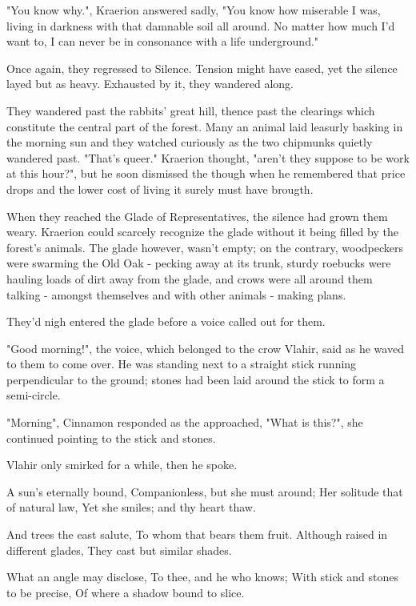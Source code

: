 "You know why.", Kraerion answered sadly, "You know how miserable I was, living in darkness with that damnable soil all around. No matter how much I'd want to, I can never be in consonance with a life underground."

Once again, they regressed to Silence. Tension might have eased, yet the silence layed but as heavy. Exhausted by it, they wandered along.

They wandered past the rabbits' great hill, thence past the clearings which constitute the central part of the forest. Many an animal laid leasurly basking in the morning sun and they watched curiously as the two chipmunks quietly wandered past. "That's queer." Kraerion thought, "aren't they suppose to be work at this hour?", but he soon dismissed the though when he remembered that price drops and the lower cost of living it surely must have brougth. %

When they reached the Glade of Representatives, the silence had grown them weary. Kraerion could scarcely recognize the glade without it being filled by the forest's animals. The glade however, wasn't empty; on the contrary, woodpeckers were swarming the Old Oak - pecking away at its trunk, sturdy roebucks were hauling loads of dirt away from the glade, and crows were all around them talking - amongst themselves and with other animals - making plans. 

They'd nigh entered the glade before a voice called out for them.

"Good morning!", the voice, which belonged to the crow Vlahir, said as he waved to them to come over. He was standing next to a straight stick running perpendicular to the ground; stones had been laid around the stick to form a semi-circle. 

"Morning", Cinnamon responded as the approached, "What is this?", she continued pointing to the stick and stones.

Vlahir only smirked for a while, then he spoke.

	A sun's eternally bound,
	Companionless, but she must around;
	Her solitude that of natural law,%
	Yet she smiles; and thy heart thaw.

	And trees the east salute,
	To whom that bears them fruit.
	Although raised in different glades,
	They cast but similar shades.

	What an angle may disclose,
	To thee, and he who knows; %
	With stick and stones to be precise,
	Of where a shadow bound to slice.


